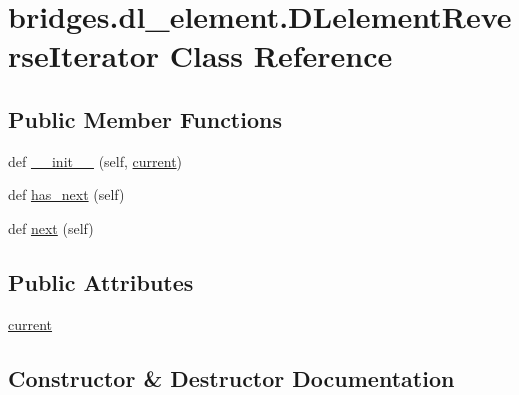 \hypertarget{classbridges_1_1dl__element_1_1_d_lelement_reverse_iterator}{}\section{bridges.\+dl\+\_\+element.\+D\+Lelement\+Reverse\+Iterator Class Reference}
\label{classbridges_1_1dl__element_1_1_d_lelement_reverse_iterator}
\subsection*{Public Member Functions}
\begin{DoxyCompactItemize}
\item 
def \hyperlink{classbridges_1_1dl__element_1_1_d_lelement_reverse_iterator_a5fd44be20babe8cb49a95338bd635aea}{\+\_\+\+\_\+init\+\_\+\+\_\+} (self, \hyperlink{classbridges_1_1dl__element_1_1_d_lelement_reverse_iterator_ae634b4f334d905570d98692f9ad3c836}{current})
\item 
def \hyperlink{classbridges_1_1dl__element_1_1_d_lelement_reverse_iterator_a18e09d0d96ddd27714ed42288906f2c6}{has\+\_\+next} (self)
\item 
def \hyperlink{classbridges_1_1dl__element_1_1_d_lelement_reverse_iterator_a1a9f512ccd2d9932a90c7598d91d7e14}{next} (self)
\end{DoxyCompactItemize}
\subsection*{Public Attributes}
\begin{DoxyCompactItemize}
\item 
\hyperlink{classbridges_1_1dl__element_1_1_d_lelement_reverse_iterator_ae634b4f334d905570d98692f9ad3c836}{current}
\end{DoxyCompactItemize}


\subsection{Constructor \& Destructor Documentation}
\mbox{\label{classbridges_1_1dl__element_1_1_d_lelement_reverse_iterator_a5fd44be20babe8cb49a95338bd635aea}} 

